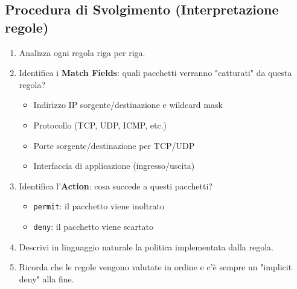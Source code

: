 \subsection{Procedura di Svolgimento (Interpretazione regole)}
\begin{enumerate}[label=\arabic*.]
    \item Analizza ogni regola riga per riga.
    \item Identifica i \textbf{Match Fields}: quali pacchetti verranno "catturati" da questa regola?
    \begin{itemize}
        \item Indirizzo IP sorgente/destinazione e wildcard mask
        \item Protocollo (TCP, UDP, ICMP, etc.)
        \item Porte sorgente/destinazione per TCP/UDP
        \item Interfaccia di applicazione (ingresso/uscita)
    \end{itemize}
    \item Identifica l'\textbf{Action}: cosa succede a questi pacchetti?
    \begin{itemize}
        \item \texttt{permit}: il pacchetto viene inoltrato
        \item \texttt{deny}: il pacchetto viene scartato
    \end{itemize}
    \item Descrivi in linguaggio naturale la politica implementata dalla regola.
    \item Ricorda che le regole vengono valutate in ordine e c'è sempre un "implicit deny" alla fine.
\end{enumerate}

